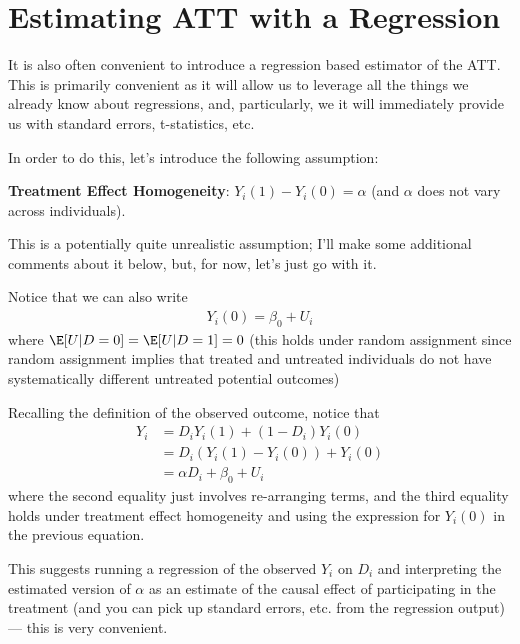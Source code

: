 \documentclass[
  letterpaper,
  DIV=11,
  numbers=noendperiod]{scrreprt}
\begin{document}
\section{Estimating ATT with a
Regression}\label{estimating-att-with-a-regression}

It is also often convenient to introduce a regression based estimator of
the ATT. This is primarily convenient as it will allow us to leverage
all the things we already know about regressions, and, particularly, we
it will immediately provide us with standard errors, t-statistics, etc.

In order to do this, let's introduce the following assumption:

\textbf{Treatment Effect Homogeneity}: \(Y_i(1) - Y_i(0) = \alpha\) (and
\(\alpha\) does not vary across individuals).

This is a potentially quite unrealistic assumption; I'll make some
additional comments about it below, but, for now, let's just go with it.

Notice that we can also write \begin{align*}
  Y_i(0) = \beta_0 + U_i
\end{align*} where \(\E[U|D=0] = \E[U|D=1] = 0\) (this holds under
random assignment since random assignment implies that treated and
untreated individuals do not have systematically different untreated
potential outcomes)

Recalling the definition of the observed outcome, notice that
\begin{align*}
  Y_i &= D_i Y_i(1) + (1-D_i) Y_i(0) \\
  &= D_i (Y_i(1) - Y_i(0)) + Y_i(0) \\
  &= \alpha D_i + \beta_0 + U_i
\end{align*} where the second equality just involves re-arranging terms,
and the third equality holds under treatment effect homogeneity and
using the expression for \(Y_i(0)\) in the previous equation.

This suggests running a regression of the observed \(Y_i\) on \(D_i\)
and interpreting the estimated version of \(\alpha\) as an estimate of
the causal effect of participating in the treatment (and you can pick up
standard errors, etc. from the regression output) --- this is very
convenient.
\end{document}
